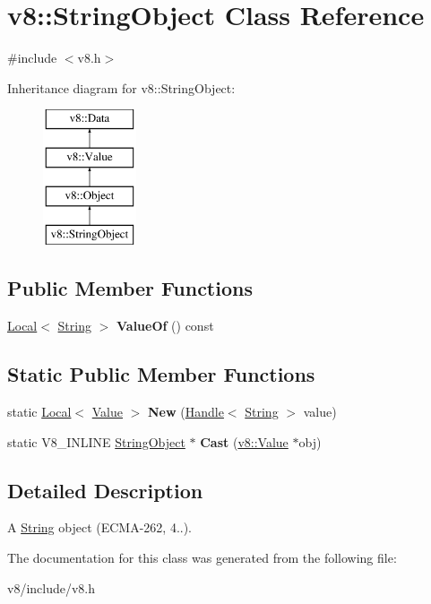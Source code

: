 \hypertarget{classv8_1_1StringObject}{\section{v8\-:\-:String\-Object Class Reference}
\label{classv8_1_1StringObject}
}


{\ttfamily \#include $<$v8.\-h$>$}

Inheritance diagram for v8\-:\-:String\-Object\-:\begin{figure}[H]
\begin{center}
\leavevmode
\includegraphics[height=4.000000cm]{classv8_1_1StringObject}
\end{center}
\end{figure}
\subsection*{Public Member Functions}
\begin{DoxyCompactItemize}
\item 
\hypertarget{classv8_1_1StringObject_a96bd6c736a0272ab7e683038953077e4}{\hyperlink{classv8_1_1Local}{Local}$<$ \hyperlink{classv8_1_1String}{String} $>$ {\bfseries Value\-Of} () const }\label{classv8_1_1StringObject_a96bd6c736a0272ab7e683038953077e4}

\end{DoxyCompactItemize}
\subsection*{Static Public Member Functions}
\begin{DoxyCompactItemize}
\item 
\hypertarget{classv8_1_1StringObject_a299c1d30b32e8bc336c8af05471a0763}{static \hyperlink{classv8_1_1Local}{Local}$<$ \hyperlink{classv8_1_1Value}{Value} $>$ {\bfseries New} (\hyperlink{classv8_1_1Handle}{Handle}$<$ \hyperlink{classv8_1_1String}{String} $>$ value)}\label{classv8_1_1StringObject_a299c1d30b32e8bc336c8af05471a0763}

\item 
\hypertarget{classv8_1_1StringObject_af2169f0b4c890196416e4d28fbf76df8}{static V8\-\_\-\-I\-N\-L\-I\-N\-E \hyperlink{classv8_1_1StringObject}{String\-Object} $\ast$ {\bfseries Cast} (\hyperlink{classv8_1_1Value}{v8\-::\-Value} $\ast$obj)}\label{classv8_1_1StringObject_af2169f0b4c890196416e4d28fbf76df8}

\end{DoxyCompactItemize}


\subsection{Detailed Description}
A \hyperlink{classv8_1_1String}{String} object (E\-C\-M\-A-\/262, 4..). 

The documentation for this class was generated from the following file\-:\begin{DoxyCompactItemize}
\item 
v8/include/v8.\-h\end{DoxyCompactItemize}
